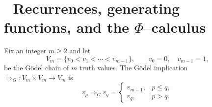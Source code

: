 \documentclass[11pt]{article}
\begin{document}


\label{sec:godel-m}

\section{ $\;$ Recurrences, generating functions, and the $\Phi$--calculus}

Fix an integer \(m\ge2\) and let
\[
V_m=\{v_0<v_1<\cdots<v_{m-1}\},\qquad v_0=0,\quad v_{m-1}=1,
\]
be the Gödel chain of \(m\) truth values. The Gödel implication \(\Rightarrow_G:V_m\times V_m\to V_m\) is
\[
v_p\Rightarrow_G v_q=
\begin{cases}
v_{m-1},& p\le q,\\
v_q,& p>q.
\end{cases}
\]
\end{document}
